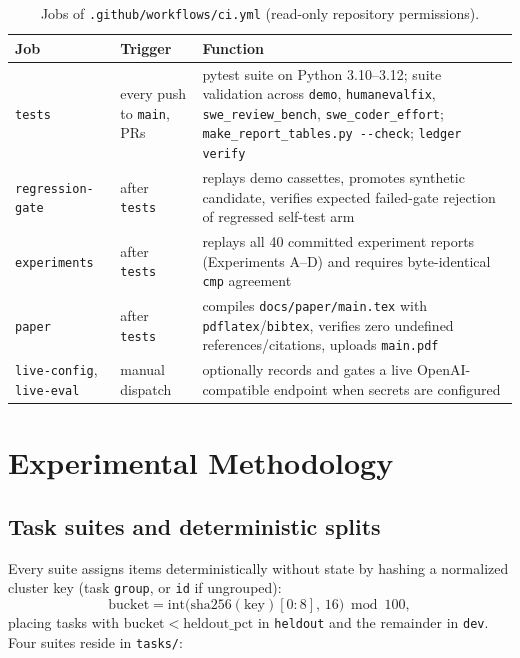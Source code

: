 \documentclass[conference]{IEEEtran}
\begin{document}
\begin{table}[!t]
\caption{Jobs of \texttt{.\allowbreak{}github/\allowbreak{}workflows/\allowbreak{}ci.\allowbreak{}yml} (read-only repository permissions).}
\label{tab:ci}
\centering
\scriptsize
\setlength{\tabcolsep}{3pt}
\begin{tabular}{>{\raggedright\arraybackslash}p{} >{\raggedright\arraybackslash}p{} >{\raggedright\arraybackslash}p{}}
\hline
Job & Trigger & Function \\
\hline
\texttt{tests} & every push to \texttt{main}, PRs & pytest suite on Python 3.10--3.12; suite validation across \texttt{demo}, \texttt{humanevalfix}, \texttt{swe\_review\_bench}, \texttt{swe\_coder\_effort}; \texttt{make\_report\_tables.py -{}-{}check}; \texttt{ledger verify} \\
\texttt{regression-{}gate} & after \texttt{tests} & replays demo cassettes, promotes synthetic candidate, verifies expected failed-gate rejection of regressed self-test arm \\
\texttt{experiments} & after \texttt{tests} & replays all 40 committed experiment reports (Experiments A--D) and requires byte-identical \texttt{cmp} agreement \\
\texttt{paper} & after \texttt{tests} & compiles \texttt{docs/paper/main.tex} with \texttt{pdflatex}/\texttt{bibtex}, verifies zero undefined references/citations, uploads \texttt{main.pdf} \\
\texttt{live-{}config}, \texttt{live-{}eval} & manual dispatch & optionally records and gates a live OpenAI-compatible endpoint when secrets are configured \\
\hline
\end{tabular}
\end{table}

\section{Experimental Methodology}
\label{sec:method}

\subsection{Task suites and deterministic splits}
\label{sec:method-suites}

Every suite assigns items deterministically without state by hashing a normalized cluster key (task \texttt{group}, or \texttt{id} if ungrouped):
\begin{equation}
\mathrm{bucket} = \mathrm{int}\big(\mathrm{sha256}(\mathrm{key})[0{:}8],\,16\big) \bmod 100,
\end{equation}
placing tasks with $\mathrm{bucket} < \mathrm{heldout\_pct}$ in \texttt{heldout} and the remainder in \texttt{dev}. Four suites reside in \texttt{tasks/}:
\end{document}
